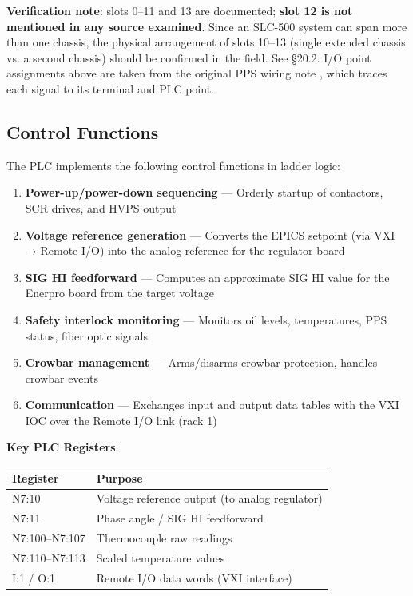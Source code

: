 \begin{keynote}
\textbf{Verification note}: slots 0--11 and 13 are documented; \textbf{slot 12 is not mentioned in any source examined}. Since an SLC-500 system can span more than one chassis, the physical arrangement of slots 10--13 (single extended chassis vs. a second chassis) should be confirmed in the field. See §20.2. I/O point assignments above are taken from the original PPS wiring note , which traces each signal to its terminal and PLC point.
\end{keynote}

\subsection{Control Functions}

The PLC implements the following control functions in ladder logic:

\begin{enumerate}
\def\labelenumi{\arabic{enumi}.}
\tightlist
\item
  \textbf{Power-up/power-down sequencing} --- Orderly startup of contactors, SCR drives, and HVPS output
\item
  \textbf{Voltage reference generation} --- Converts the EPICS setpoint (via VXI → Remote I/O) into the analog reference for the regulator board
\item
  \textbf{SIG HI feedforward} --- Computes an approximate SIG HI value for the Enerpro board from the target voltage
\item
  \textbf{Safety interlock monitoring} --- Monitors oil levels, temperatures, PPS status, fiber optic signals
\item
  \textbf{Crowbar management} --- Arms/disarms crowbar protection, handles crowbar events
\item
  \textbf{Communication} --- Exchanges input and output data tables with the VXI IOC over the Remote I/O link (rack 1)
\end{enumerate}

\textbf{Key PLC Registers}:

\begin{longtable}[]{@{}ll@{}}
\toprule\noalign{}
Register & Purpose \\
\midrule\noalign{}
\endhead
\bottomrule\noalign{}
\endlastfoot
N7:10 & Voltage reference output (to analog regulator) \\
N7:11 & Phase angle / SIG HI feedforward \\
N7:100--N7:107 & Thermocouple raw readings \\
N7:110--N7:113 & Scaled temperature values \\
I:1 / O:1 & Remote I/O data words (VXI interface) \\
\end{longtable}

